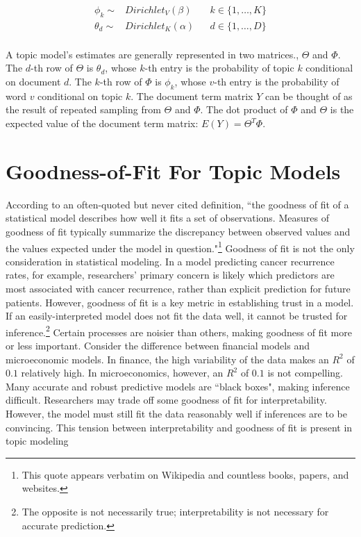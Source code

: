 \documentclass[12pt]{amsart}
\begin{document}
\begin{align*}
\phi_k \sim& Dirichlet_V(\beta) && k\in\{1, \ldots, K\} \\
{\theta}_d \sim& Dirichlet_K({\alpha}) && d\in\{1, \ldots, D\}\\
\end{align*}

A topic model's estimates are generally represented in two matrices., $\Theta$ and $\Phi$. The $d$-th row of $\Theta$ is $\theta_d$, whose $k$-th entry is the probability of topic $k$ conditional on document $d$. The $k$-th row of $\Phi$ is $\phi_k$, whose $v$-th entry is the probability of word $v$ conditional on topic $k$. The document term matrix $Y$ can be thought of as the result of repeated sampling from $\Theta$ and $\Phi$. The dot product of $\Phi$ and $\Theta$ is the expected value of the document term matrix: $E(Y) = \Theta^T\Phi$. 

\section{Goodness-of-Fit For Topic Models}

According to an often-quoted but never cited definition, ``the goodness of fit of a statistical model describes how well it fits a set of observations. Measures of goodness of fit typically summarize the discrepancy between observed values and the values expected under the model in question."\footnote{This quote appears verbatim on Wikipedia and countless books, papers, and websites.} Goodness of fit is not the only consideration in statistical modeling. In a model predicting cancer recurrence rates, for example, researchers' primary concern is likely which predictors are most associated with cancer recurrence, rather than explicit prediction for future patients. However, goodness of fit is a key metric in establishing trust in a model. If an easily-interpreted model does not fit the data well, it cannot be trusted for inference.\footnote{The opposite is not necessarily true; interpretability is not necessary for accurate prediction.} Certain processes are noisier than others, making goodness of fit more or less important. Consider the difference between financial models and microeconomic models. In finance, the high variability of the data makes an $R^2$ of $0.1$ relatively high. In microeconomics, however, an $R^2$ of $0.1$ is not compelling. Many accurate and robust predictive models are ``black boxes", making inference difficult. Researchers may trade off some goodness of fit for interpretability. However, the model must still fit the data reasonably well if inferences are to be convincing. This tension between interpretability and goodness of fit is present in topic modeling
\end{document}
